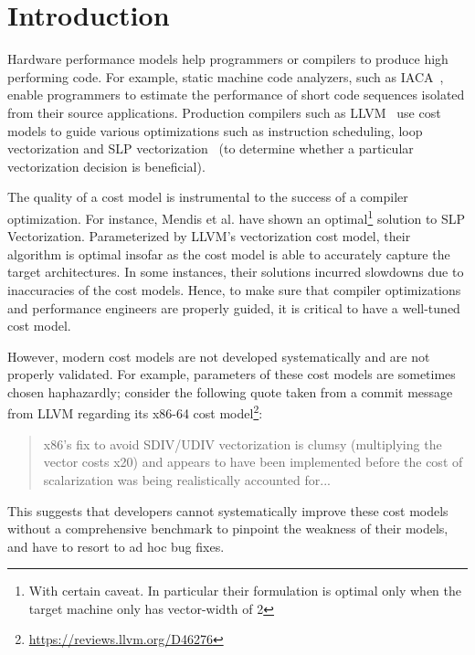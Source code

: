 \section{Introduction}

Hardware performance models help programmers or compilers to 
produce high performing code.
For example, static machine code analyzers, such as IACA~\cite{iaca}, enable programmers
to estimate the performance of short code sequences
isolated from their source applications.
Production compilers such as LLVM~\cite{llvm} use cost models to guide various optimizations such as instruction scheduling, loop
vectorization and SLP vectorization~\cite{slp} (to determine whether a particular vectorization decision is beneficial).

The quality of a cost model is instrumental to the success of a compiler optimization. 
For instance, Mendis et al.\cite{goslp}
have shown an optimal\footnote{
With certain caveat.
In particular their formulation is optimal
only when the target machine only has vector-width of 2}
solution to SLP Vectorization\cite{slp}.
Parameterized by LLVM's vectorization cost model\cite{llvm-cost},
their algorithm is optimal insofar as the cost model is able to accurately 
capture the target architectures.
In some instances, their solutions incurred slowdowns due to inaccuracies of 
the cost models.
Hence, to make sure that compiler optimizations and performance engineers are properly guided, it is critical to have 
a well-tuned cost model.

However, modern cost models are not developed systematically and are not properly validated.
For example, parameters of these cost models 
are sometimes chosen haphazardly;
consider the following quote taken from a commit message from LLVM\cite{llvm}
regarding its x86-64 cost model\footnote{
\url{https://reviews.llvm.org/D46276}
}:
\begin{quote}
x86's fix to avoid SDIV/UDIV vectorization is clumsy
(multiplying the vector costs x20)
and appears to have been implemented before the cost of
scalarization was being realistically accounted for...
\end{quote}
This suggests that
developers cannot systematically improve these cost models
without a comprehensive benchmark to pinpoint the weakness of their models,
and have to resort to ad hoc bug fixes.

